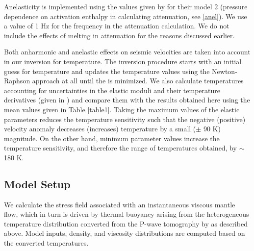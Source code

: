 \documentclass[draft,linenumbers]{agujournal2018}
\begin{document}
Anelasticity is implemented using the values given by \citet{sobolev1996upper} for their model 2 (pressure dependence on activation enthalpy in calculating attenuation, see \ref{anel}). We use a value of 1 Hz for the frequency in the attenuation calculation. We do not include the effects of melting in attenuation for the reasons discussed earlier.

Both anharmonic and anelastic effects on seismic velocities  are taken into account in our inversion for temperature. The inversion procedure starts with an initial guess for temperature and updates the temperature values using the Newton-Raphson approach at all  until the  is minimized. We also calculate temperatures accounting for uncertainties in the elastic moduli and their temperature derivatives (given in \citet{Cammarano2003}) and compare them with the results obtained here using the mean values given in Table \ref{table1}. Taking the maximum values of the elastic parameters reduces the temperature sensitivity such that the negative (positive) velocity anomaly decreases (increases) temperature by a small ($\pm$ 90 K) magnitude. On the other hand, minimum parameter values increase the temperature sensitivity, and therefore the range of temperatures obtained, by $\sim$ 180 K. 

\subsection{Model Setup}
    We calculate the stress field associated with an instantaneous viscous mantle flow, which in turn is driven by thermal buoyancy arising from the heterogeneous temperature distribution converted from the P-wave tomography by \citet{Biryol_2016} as described above. Model inputs, density, and viscosity distributions are computed based on the converted temperatures. 
    
\end{document}
